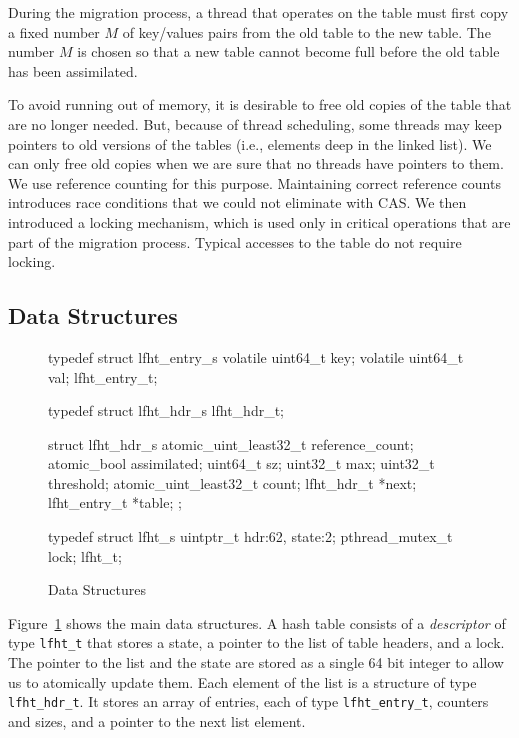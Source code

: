 During the migration process, a thread that operates on the table must
first copy a fixed number $M$ of key/values pairs from the old table
to the new table. The number $M$ is chosen so that a new table cannot
become full before the old table has been assimilated.

To avoid running out of memory, it is desirable to free old copies of
the table that are no longer needed. But, because of thread
scheduling, some threads may keep pointers to old versions of the
tables (i.e., elements deep in the linked list). We can only free old
copies when we are sure that no threads have pointers to them. We use
reference counting for this purpose. Maintaining correct reference
counts introduces race conditions that we could not eliminate with
CAS.  We then introduced a locking mechanism, which is used only in
critical operations that are part of the migration process. Typical
accesses to the table do not require locking.


\subsection{Data Structures}

\begin{figure}
\begin{center}
\begin{clisting}
typedef struct lfht_entry_s {
  volatile uint64_t  key;
  volatile uint64_t  val;
} lfht_entry_t;

typedef struct lfht_hdr_s lfht_hdr_t;

struct lfht_hdr_s {
  atomic_uint_least32_t reference_count;
  atomic_bool assimilated;
  uint64_t sz;
  uint32_t max;
  uint32_t threshold;
  atomic_uint_least32_t count;
  lfht_hdr_t *next;
  lfht_entry_t *table;
};

typedef struct lfht_s {
  uintptr_t hdr:62, state:2;
  pthread_mutex_t lock;
} lfht_t;
\end{clisting}
\end{center}
\caption{Data Structures}
\label{fig:datastructures}
\end{figure}

Figure~\ref{fig:datastructures} shows the main data structures. A hash
table consists of a {\em descriptor\/} of type \texttt{lfht\_t} that
stores a state, a pointer to the list of table headers, and a lock.
The pointer to the list and the state are stored as a single 64 bit integer
to allow us to atomically update them.
Each
element of the list is a structure of type \texttt{lfht\_hdr\_t}. It
stores an array of entries, each of type \texttt{lfht\_entry\_t}, counters and sizes, and a pointer to the
next list element.

